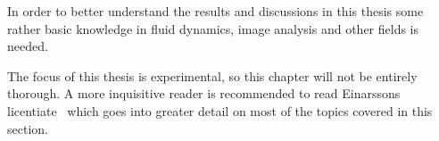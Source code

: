 In order to better understand the results and discussions in this thesis some rather basic knowledge in fluid dynamics, image analysis and other fields is needed. 

The focus of this thesis is experimental, so this chapter will not be entirely thorough. A more inquisitive reader is recommended to read Einarssons licentiate~\cite{JonasLic} which goes into greater detail on most of the topics covered in this section.